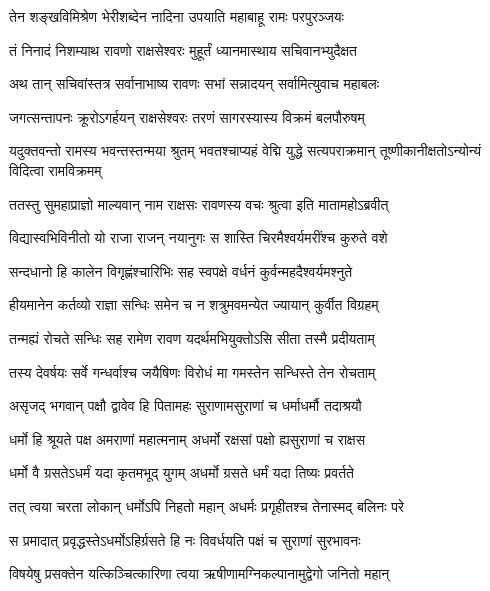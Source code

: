 
\twolineshloka
{तेन शङ्खविमिश्रेण भेरीशब्देन नादिना}
{उपयाति महाबाहू रामः परपुरञ्जयः} %

\twolineshloka
{तं निनादं निशम्याथ रावणो राक्षसेश्वरः}
{मुहूर्तं ध्यानमास्थाय सचिवानभ्युदैक्षत} %

\twolineshloka
{अथ तान् सचिवांस्तत्र सर्वानाभाष्य रावणः}
{सभां सन्नादयन् सर्वामित्युवाच महाबलः} %

\twolineshloka
{जगत्सन्तापनः क्रूरोऽगर्हयन् राक्षसेश्वरः}
{तरणं सागरस्यास्य विक्रमं बलपौरुषम्} %

\threelineshloka
{यदुक्तवन्तो रामस्य भवन्तस्तन्मया श्रुतम्}
{भवतश्चाप्यहं वेद्मि युद्धे सत्यपराक्रमान्}
{तूष्णीकानीक्षतोऽन्योन्यं विदित्वा रामविक्रमम्} %

\twolineshloka
{ततस्तु सुमहाप्राज्ञो माल्यवान् नाम राक्षसः}
{रावणस्य वचः श्रुत्वा इति मातामहोऽब्रवीत्} %

\twolineshloka
{विद्यास्वभिविनीतो यो राजा राजन् नयानुगः}
{स शास्ति चिरमैश्वर्यमरींश्च कुरुते वशे} %

\twolineshloka
{सन्दधानो हि कालेन विगृह्णंश्चारिभिः सह}
{स्वपक्षे वर्धनं कुर्वन्महदैश्वर्यमश्नुते} %

\twolineshloka
{हीयमानेन कर्तव्यो राज्ञा सन्धिः समेन च}
{न शत्रुमवमन्येत ज्यायान् कुर्वीत विग्रहम्} %

\twolineshloka
{तन्मह्यं रोचते सन्धिः सह रामेण रावण}
{यदर्थमभियुक्तोऽसि सीता तस्मै प्रदीयताम्} %

\twolineshloka
{तस्य देवर्षयः सर्वे गन्धर्वाश्च जयैषिणः}
{विरोधं मा गमस्तेन सन्धिस्ते तेन रोचताम्} %

\twolineshloka
{असृजद् भगवान् पक्षौ द्वावेव हि पितामहः}
{सुराणामसुराणां च धर्माधर्मौ तदाश्रयौ} %

\twolineshloka
{धर्मो हि श्रूयते पक्ष अमराणां महात्मनाम्}
{अधर्मो रक्षसां पक्षो ह्यसुराणां च राक्षस} %

\twolineshloka
{धर्मो वै ग्रसतेऽधर्मं यदा कृतमभूद् युगम्}
{अधर्मो ग्रसते धर्मं यदा तिष्यः प्रवर्तते} %

\twolineshloka
{तत् त्वया चरता लोकान् धर्मोऽपि निहतो महान्}
{अधर्मः प्रगृहीतश्च तेनास्मद् बलिनः परे} %

\twolineshloka
{स प्रमादात् प्रवृद्धस्तेऽधर्मोऽहिर्ग्रसते हि नः}
{विवर्धयति पक्षं च सुराणां सुरभावनः} %

\twolineshloka
{विषयेषु प्रसक्तेन यत्किञ्चित्कारिणा त्वया}
{ऋषीणामग्निकल्पानामुद्वेगो जनितो महान्} %

